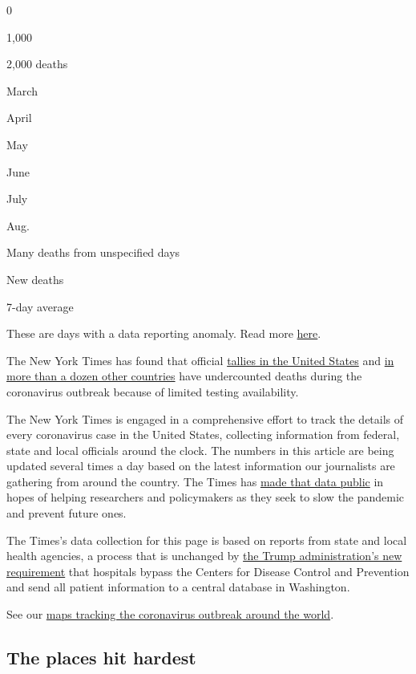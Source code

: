 0

1,000

2,000 deaths

March

April

May

June

July

Aug.

Many deaths from unspecified days

New deaths

7-day average

These are days with a data reporting anomaly. Read more
\protect\hyperlink{anomaly-notes}{here}.

The New York Times has found that official
\href{https://www.nytimes.com/interactive/2020/04/28/us/coronavirus-death-toll-total.html}{tallies
in the United States} and
\href{https://www.nytimes.com/interactive/2020/04/21/world/coronavirus-missing-deaths.html}{in
more than a dozen other countries} have undercounted deaths during the
coronavirus outbreak because of limited testing availability.

The New York Times is engaged in a comprehensive effort to track the
details of every coronavirus case in the United States, collecting
information from federal, state and local officials around the clock.
The numbers in this article are being updated several times a day based
on the latest information our journalists are gathering from around the
country. The Times has
\href{https://www.nytimes.com/article/coronavirus-county-data-us.html?action=click\&module=Spotlight\&pgtype=Homepage}{made
that data public} in hopes of helping researchers and policymakers as
they seek to slow the pandemic and prevent future ones.

The Times's data collection for this page is based on reports from state
and local health agencies, a process that is unchanged by
\href{https://www.nytimes.com/2020/07/14/us/politics/trump-cdc-coronavirus.html}{the
Trump administration's new requirement} that hospitals bypass the
Centers for Disease Control and Prevention and send all patient
information to a central database in Washington.

See our
\href{https://www.nytimes.com/interactive/2020/world/coronavirus-maps.html}{maps
tracking the coronavirus outbreak around the world}.

\hypertarget{the-places-hit-hardest}{%
\subsection{The places hit hardest}\label{the-places-hit-hardest}}

